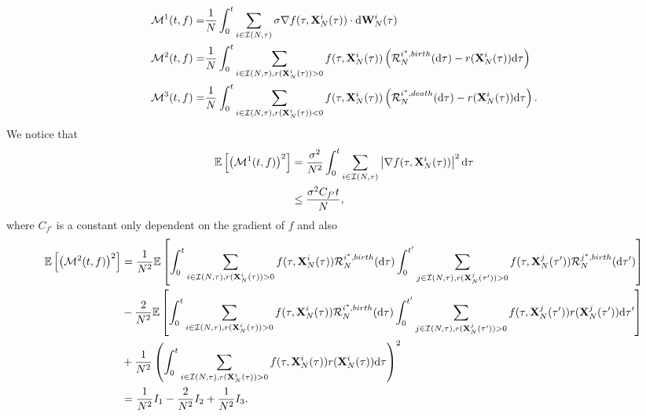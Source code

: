 \documentclass[12pt]{article}
\begin{document}
\begin{equation*}
    \begin{aligned}
        \mathcal M^1(t,f) =& \frac{1}{N} \int_0^t \sum_{i\in \mathcal I(N,\tau)} \sigma \nabla f(\tau,\mathbf{X}_N^i(\tau))\cdot \mathrm{d} \mathbf{W}_N^i(\tau)\\
        \mathcal M^2(t,f) =& \frac{1}{N} \int_0^t \sum_{i\in \mathcal I(N,\tau), r(\mathbf{X}^i_N(\tau))>0} f(\tau,\mathbf{X}_N^i(\tau))\left(\mathcal R_N^{i^*,birth}(\mathrm{d} \tau) -r(\mathbf{X}_N^i(\tau))\mathrm{d} \tau\right)\\
        \mathcal M^3(t,f) =& \frac{1}{N} \int_0^t \sum_{i\in \mathcal I(N,\tau), r(\mathbf{X}^i_N(\tau))<0} f(\tau,\mathbf{X}_N^i(\tau)) \left(\mathcal R_N^{i^*,death}(\mathrm{d} \tau)-r(\mathbf{X}_N^i(\tau))\mathrm{d} \tau\right).
    \end{aligned}
\end{equation*}
We notice that 
\begin{equation}
\begin{aligned}
    \mathbb E\left[ \left(\mathcal M^1(t,f) \right)^2\right] &= \frac{\sigma^2}{N^2} \int_0^t \sum_{i\in \mathcal I(N,\tau)}  \left|\nabla f(\tau,\mathbf{X}_N^i(\tau))\right|^2 \mathrm{d} \tau \\
    & \leq \frac{\sigma^2C_{f'}t}{N},
\end{aligned}
\end{equation}
where $C_{f'}$ is a constant only dependent on the gradient of $f$
and also 
\begin{equation*}
    \begin{aligned}
       \mathbb E\left[ \left(\mathcal M^2(t,f) \right)^2\right] &= \frac{1}{N^2}  \mathbb E\left[ \int_0^t \sum_{i\in \mathcal I(N,\tau), r(\mathbf{X}^i_N(\tau))>0}  f(\tau,\mathbf{X}_N^i(\tau))\mathcal R_N^{i^*,birth}(\mathrm{d} \tau)\int_0^{t'} \sum_{j\in \mathcal I(N,\tau), r(\mathbf{X}^j_N(\tau'))>0}  f(\tau,\mathbf{X}_N^j(\tau'))\mathcal R_N^{j^*,birth}(\mathrm{d} \tau')\right]\\
       & - \frac{2}{N^2} \mathbb E\left[\int_0^t \sum_{i\in \mathcal I(N,\tau), r(\mathbf{X}^i_N(\tau))>0}  f(\tau,\mathbf{X}_N^i(\tau))\mathcal R_N^{i^*,birth}(\mathrm{d} \tau)\int_0^{t'} \sum_{j\in \mathcal I(N,\tau), r(\mathbf{X}^j_N(\tau'))>0}  f(\tau,\mathbf{X}_N^j(\tau'))r(\mathbf{X}_N^j(\tau'))\mathrm{d} \tau'\right]\\
       & + \frac{1}{N^2} \left(\int_0^{t} \sum_{i\in \mathcal I(N,\tau), r(\mathbf{X}^i_N(\tau))>0}  f(\tau,\mathbf{X}_N^i(\tau))r(\mathbf{X}_N^i(\tau))\mathrm{d} \tau\right)^2\\
       & = \frac{1}{N^2}I_1-\frac{2}{N^2}I_2+\frac{1}{N^2}I_3.
    \end{aligned}
\end{equation*}
\end{document}
